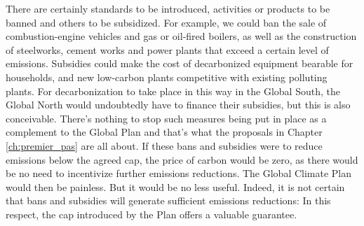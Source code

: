 \documentclass[a5paper,english,openany]{memoir}
\begin{document}
There are certainly standards to be introduced, activities or products to be banned and others to be subsidized. %
For example, we could ban the sale of combustion-engine vehicles and gas or oil-fired boilers, as well as the construction of steelworks, cement works and power plants that exceed a certain level of emissions. Subsidies could make the cost of decarbonized %
equipment bearable for households, and new low-carbon plants competitive with existing polluting plants. For decarbonization %
to take place in this way in the Global South, the Global North would undoubtedly have to finance their subsidies, but this is also conceivable. There's nothing to stop such measures being put in place as a complement to the Global Plan %
and that's what the proposals in Chapter \ref{ch:premier_pas} are all about. If these bans and subsidies were to reduce emissions below the agreed cap, the price of carbon would be zero, as there would be no need to incentivize %
further emissions reductions. The Global Climate Plan would then be painless. But it would be no less useful. Indeed, it is not certain that bans and subsidies will generate sufficient emissions reductions: In this respect, the cap introduced by the Plan offers a valuable guarantee. %
\end{document}
